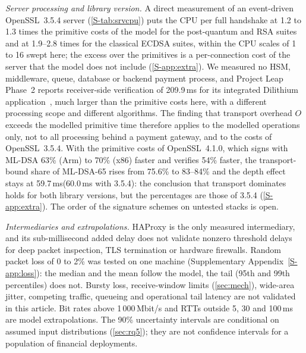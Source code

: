 \documentclass[preprint,12pt]{elsarticle}
\newcommand{\ms}{\,ms\xspace}
\newcommand{\Mbits}{\,Mbit/s\xspace}
\begin{document}
\emph{Server processing and library version.} A direct measurement of an event-driven OpenSSL~3.5.4 server (\cref{S-tab:srvcpu}) puts the CPU per full handshake at 1.2 to 1.3 times the primitive costs of the model for the post-quantum and RSA suites and at 1.9--2.8 times for the classical ECDSA suites, within the CPU scales of 1 to 16 swept here; the excess over the primitives is a per-connection cost of the server that the model does not include (\cref{S-app:extra}). We measured no HSM, middleware, queue, database or backend payment process, and Project Leap Phase~2 reports receiver-side verification of 209.9\ms for its integrated Dilithium application~\cite{bis_leap2025}, much larger than the primitive costs here, with a different processing scope and different algorithms. The finding that transport overhead $O$ exceeds the modelled primitive time therefore applies to the modelled operations only, not to all processing behind a payment gateway, and to the costs of OpenSSL~3.5.4. With the primitive costs of OpenSSL~4.1.0, which signs with ML-DSA 63\% (Arm) to 70\% (x86) faster and verifies 54\% faster, the transport-bound share of ML-DSA-65 rises from 75.6\% to 83--84\% and the depth effect stays at 59.7\ms (60.0\ms with 3.5.4): the conclusion that transport dominates holds for both library versions, but the percentages are those of 3.5.4 (\cref{S-app:extra}). The order of the signature schemes on untested stacks is open.

\emph{Intermediaries and extrapolations.} HAProxy is the only measured intermediary, and its sub-millisecond added delay does not validate nonzero threshold delays for deep packet inspection, TLS termination or hardware firewalls. Random packet loss of 0 to 2\% was tested on one machine (Supplementary Appendix~\ref{S-app:loss}): the median and the mean follow the model, the tail (95th and 99th percentiles) does not. Bursty loss, receive-window limits (\cref{sec:mech}), wide-area jitter, competing traffic, queueing and operational tail latency are not validated in this article. Bit rates above 1\,000\Mbits and RTTs outside 5, 30 and 100\ms are model extrapolations. The 90\% uncertainty intervals are conditional on assumed input distributions (\cref{sec:rq5}); they are not confidence intervals for a population of financial deployments.
\end{document}
